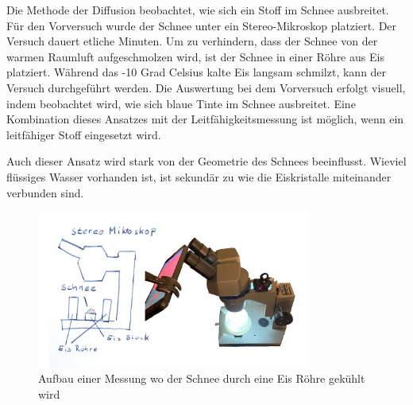 Die Methode der Diffusion beobachtet, wie sich ein Stoff im Schnee ausbreitet. Für den Vorversuch wurde der Schnee unter ein Stereo-Mikroskop platziert. Der Versuch dauert etliche Minuten. Um zu verhindern, dass der Schnee von der warmen Raumluft aufgeschmolzen wird, ist der Schnee in einer Röhre aus Eis platziert. Während das -10 Grad Celsius kalte Eis langsam schmilzt, kann der Versuch durchgeführt werden. Die Auswertung bei dem Vorversuch erfolgt visuell, indem beobachtet wird, wie sich blaue Tinte im Schnee ausbreitet. Eine Kombination dieses Ansatzes mit der Leitfähigkeitsmessung ist möglich, wenn ein leitfähiger Stoff eingesetzt wird.

Auch dieser Ansatz wird stark von der Geometrie des Schnees beeinflusst. Wieviel flüssiges Wasser vorhanden ist, ist sekundär zu wie die Eiskristalle miteinander verbunden sind.

\begin{figure}
    \centering
    \includegraphics[width=0.8\textwidth]{Bilder/freistellen.jpeg}
    \caption{Aufbau einer Messung wo der Schnee durch eine Eis Röhre gekühlt wird}
    \label{fig:AutMess}
\end{figure}
